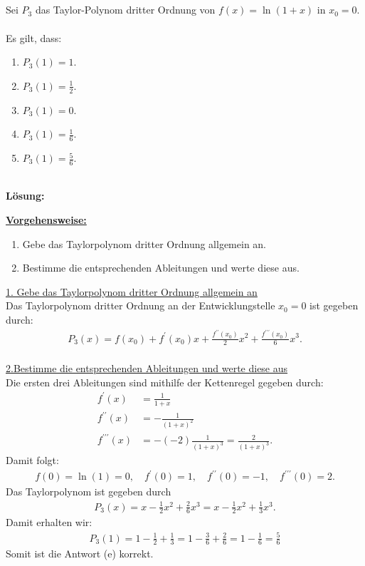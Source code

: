 \subsection*{}
Sei $P_3$ das Taylor-Polynom dritter Ordnung von $f(x) = \ln(1+ x) $ in $x_0 = 0$.\\
\\
Es gilt, dass:
\renewcommand{\labelenumi}{(\alph{enumi})}
\begin{enumerate}
	\item 
	$P_3(1) = 1 $.
	\item 
	$P_3(1) = \frac{1 }{2}$.
	\item
	$P_3(1) =  0$.
	\item
	$P_3(1) = \frac{1 }{6}$.
	\item
	$P_3(1) = \frac{5 }{6}$.
\end{enumerate}
\ \\
\textbf{Lösung:}
\begin{mdframed}
\underline{\textbf{Vorgehensweise:}}
\renewcommand{\labelenumi}{\theenumi.}
\begin{enumerate}
\item Gebe das Taylorpolynom dritter Ordnung allgemein an.
\item Bestimme die entsprechenden Ableitungen und werte diese aus.
\end{enumerate}
\end{mdframed}

\underline{1. Gebe das Taylorpolynom dritter Ordnung allgemein an}\\
Das Taylorpolynom dritter Ordnung an der Entwicklungstelle $x_0 = 0$ ist gegeben durch:
\begin{align*}
	P_3(x)
	=
	f(x_0)
	+
	f^{\prime}(x_0)x
	+
	\frac{f^{\prime \prime}(x_0)}{2} x^2
	+
	\frac{f^{\prime \prime \prime } (x_0) }{6} x^3.	
\end{align*}
\ \\
\underline{2.Bestimme die entsprechenden Ableitungen und werte diese aus}\\
Die ersten drei Ableitungen sind mithilfe der Kettenregel gegeben durch:
\begin{align*}
	f^\prime(x) 
	&= 
	\frac{1}{1+x}\\
	f^{\prime \prime }(x)
	&= 
	-\frac{1}{(1+x)^2}
	\\
	f^{\prime \prime \prime} (x)
	&=
	-(-2)\frac{1}{(1+x)^3}
	=
	\frac{2}{(1+x)^3}
	.
\end{align*}
Damit folgt:
\begin{align*}
	f(0) = \ln(1) = 0, \quad
	f^\prime(0) = 1, \quad
	f^{\prime \prime}(0) = -1, \quad
	f^{\prime \prime \prime} ( 0) = 2.
\end{align*}
Das Taylorpolynom ist gegeben durch
\begin{align*}
	P_3(x)
	=
	x - 
	\frac{1}{2} x^2
	+
	\frac{2}{6} x^3
	=
	x -\frac{1}{2} x^2 + \frac{1}{3} x^3.
\end{align*}
Damit erhalten wir:
\begin{align*}
	P_3(1) = 1 - \frac{1}{2} + \frac{1}{3}
	= 1 - \frac{3 }{6} + \frac{2}{6}
	= 1 - \frac{1}{6} = \frac{5}{6}
\end{align*}
Somit ist die Antwort (e) korrekt.


